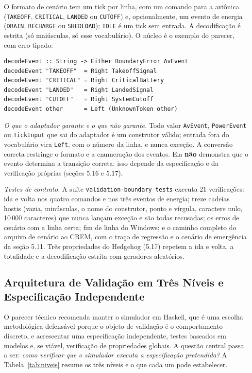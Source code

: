 \documentclass[12pt,a4paper]{article}
\begin{document}
O formato de cenário tem um tick por linha, com um comando para a aviônica (\texttt{TAKEOFF}, \texttt{CRITICAL}, \texttt{LANDED} ou \texttt{CUTOFF}) e, opcionalmente, um evento de energia (\texttt{DRAIN}, \texttt{RECHARGE} ou \texttt{SHEDLOAD}); \texttt{IDLE} é um tick sem entrada. A decodificação é estrita (só maiúsculas, só esse vocabulário). O núcleo é o exemplo do parecer, com erro tipado:

\begin{verbatim}
decodeEvent :: String -> Either BoundaryError AvEvent
decodeEvent "TAKEOFF"  = Right TakeoffSignal
decodeEvent "CRITICAL" = Right CriticalBattery
decodeEvent "LANDED"   = Right LandedSignal
decodeEvent "CUTOFF"   = Right SystemCutoff
decodeEvent other      = Left (UnknownToken other)
\end{verbatim}

\textit{O que o adaptador garante e o que não garante.} Todo valor \texttt{AvEvent}, \texttt{PowerEvent} ou \texttt{TickInput} que sai do adaptador é um construtor válido; entrada fora do vocabulário vira \texttt{Left}, com o número da linha, e nunca exceção. A conversão correta restringe o formato e a enumeração dos eventos. Ela \textbf{não} demonstra que o evento determina a transição correta: isso depende da especificação e da verificação próprias (seções 5.16 e 5.17).

\textit{Testes de contrato.} A suíte \texttt{validation-boundary-tests} executa 21 verificações: ida e volta nos quatro comandos e nos três eventos de energia; treze cadeias hostis (vazia, minúsculas, o nome do construtor, ponto e vírgula, caractere nulo, 10\,000 caracteres) que nunca lançam exceção e são todas recusadas; os erros de cenário com a linha certa; fim de linha do Windows; e o caminho completo do arquivo de cenário ao CREM, com o traço de regressão e o cenário de emergência da seção 5.11. Três propriedades do Hedgehog (5.17) repetem a ida e volta, a totalidade e a decodificação estrita com geradores aleatórios.

\subsection{Arquitetura de Validação em Três Níveis e Especificação Independente}

O parecer técnico recomenda manter o simulador em Haskell, que é uma escolha metodológica defensável porque o objeto de validação é o comportamento discreto, e acrescentar uma especificação independente, testes baseados em modelos e, se viável, verificação de propriedades globais. A questão central passa a ser: \textit{como verificar que o simulador executa a especificação pretendida?} A Tabela~\ref{tab:niveis} resume os três níveis e o que cada um pode estabelecer.
\end{document}
